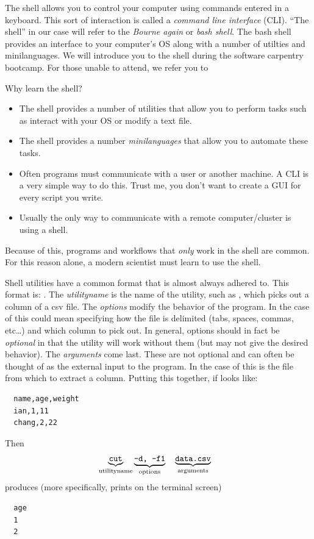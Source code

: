 The shell allows you to control your computer using commands entered in a keyboard.  This sort of interaction is called a \emph{command line interface} (CLI).  ``The shell'' in our case will refer to the \emph{Bourne again} or \emph{bash shell}.  The bash shell provides an interface to your computer's OS along with a number of utilties and minilanguages.  We will introduce you to the shell during the software carpentry bootcamp.  For those unable to attend, we refer you to

Why learn the shell?
\begin{itemize}
  \item The shell provides a number of utilities that allow you to perform tasks such as interact with your OS or modify a text file.
  \item The shell provides a number \emph{minilanguages} that allow you to automate these tasks.
  \item Often programs must communicate with a user or another machine.  A CLI is a very simple way to do this.  Trust me, you don't want to create a GUI for every script you write.
  \item Usually the only way to communicate with a remote computer/cluster is using a shell.
\end{itemize}

Because of this, programs and workflows that \emph{only} work in the shell are common.  For this reason alone, a modern scientist must learn to use the shell.

Shell utilities have a common format that is almost always adhered to.  This format is:  .  The \emph{utilityname} is the name of the utility, such as , which picks out a column of a csv file.  The \emph{options} modify the behavior of the program.  In the case of  this could mean specifying how the file is delimited (tabs, spaces, commas, etc\ldots) and which column to pick out.  In general, options should in fact be \emph{optional} in that the utility will work without them (but may not give the desired behavior).  The \emph{arguments} come last.  These are not optional and can often be thought of as the external input to the program.  In the case of  this is the file from which to extract a column.  Putting this together, if  looks like:
\begin{verbatim}
  name,age,weight
  ian,1,11
  chang,2,22
\end{verbatim}
Then
\begin{align}
  &\underbrace{\texttt{cut}}_\text{utilityname}  \underbrace{\texttt{-d, -f1}}_\text{options}\quad \underbrace{\texttt{data.csv}}_\text{arguments}
  \label{unix:align:cut}
\end{align}
produces (more specifically, prints on the terminal screen)
\begin{verbatim}
  age
  1
  2
\end{verbatim}

